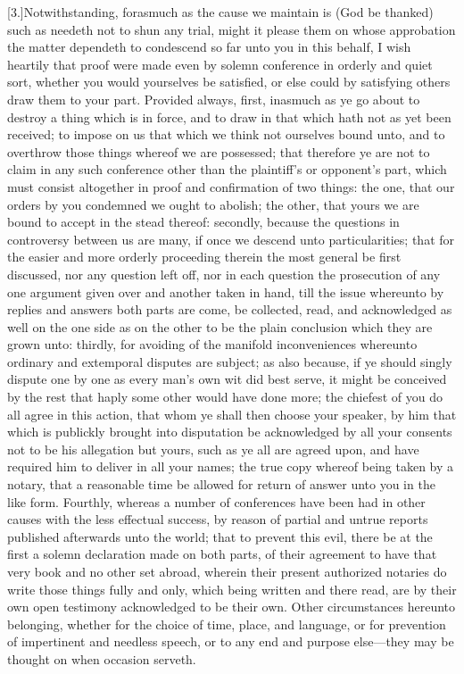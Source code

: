 [3.]Notwithstanding, forasmuch as the cause we maintain is (God be thanked) such as needeth not to shun any trial, might it please them on whose approbation the matter dependeth to condescend so far unto you in this behalf, I  wish heartily that proof were made even by solemn conference in orderly and quiet sort, whether you would yourselves be satisfied, or else could by satisfying others draw them to your part. Provided always, first, inasmuch as ye go about to destroy a thing which is in force, and to draw in that which hath not as yet been received; to impose on us that which we think not ourselves bound unto, and to overthrow those things whereof we are possessed; that therefore ye are not to claim in any such conference other than the plaintiff’s or opponent’s part, which must consist altogether in proof and confirmation of two things: the one, that our orders by you condemned we ought to abolish; the other, that yours we are bound to accept in the stead thereof: secondly, because the questions in controversy between us are many, if once we descend unto particularities; that for the easier and more orderly proceeding therein the most general be first discussed, nor any question left off, nor in each question the prosecution of any one argument given over and another taken in hand, till the issue whereunto by replies and answers both parts are come, be collected, read, and acknowledged as well on the one side as on the other to be the plain conclusion which they are grown unto: thirdly, for avoiding of the manifold inconveniences whereunto ordinary and extemporal disputes are subject; as also because, if ye should singly dispute one by one as every man’s own wit did best serve, it might be conceived by the rest that haply some other would have done more; the chiefest of you do all agree in this action, that whom ye shall then choose your speaker, by him that which is publickly brought into disputation be acknowledged by all your consents not to be his allegation but yours, such as ye all are agreed upon, and have required him to deliver in all your names; the true copy whereof being taken by a notary, that a reasonable time be allowed for return of answer unto you in the like form. Fourthly, whereas a number of conferences have been had in other causes with the less effectual success, by reason of partial and untrue reports published afterwards unto the world; that to prevent this evil, there be at the first a solemn declaration made on both parts, of their agreement to have that very book and no other set abroad, wherein their present authorized notaries do write those things fully and only, which being written and there read, are by their own open testimony acknowledged to be their own. Other circumstances hereunto belonging, whether for the choice of time, place, and language, or for prevention of impertinent and needless speech, or to any end and purpose else—they may be thought on when occasion serveth.

